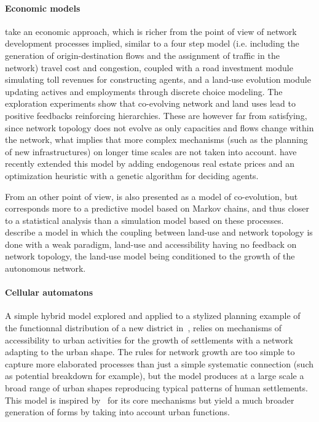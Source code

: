 \paragraph{Economic models}



\cite{levinson2007co} take an economic approach, which is richer from the point of view of network development processes implied, similar to a four step model (i.e. including the generation of origin-destination flows and the assignment of traffic in the network)  travel cost and congestion, coupled with a road investment module simulating toll revenues for constructing agents, and a land-use evolution module updating actives and employments through discrete choice modeling. The exploration experiments show that co-evolving network and land uses lead to positive feedbacks reinforcing hierarchies. These are however far from satisfying, since network topology does not evolve as only capacities and flows change within the network, what implies that more complex mechanisms (such as the planning of new infrastructures) on longer time scales are not taken into account. \cite{li2016integrated} have recently extended this model by adding endogenous real estate prices and an optimization heuristic with a genetic algorithm for deciding agents.


From an other point of view, \citep{levinson2005paving} is also presented as a model of co-evolution, but corresponds more to a predictive model based on Markov chains, and thus closer to a statistical analysis than a simulation model based on these processes. \cite{rui2011urban} describe a model in which the coupling between land-use and network topology is done with a weak paradigm, land-use and accessibility having no feedback on network topology, the land-use model being conditioned to the growth of the autonomous network.




\paragraph{Cellular automatons}


A simple hybrid model explored and applied to a stylized planning example of the functionnal distribution of a new district in~\citep{raimbault2014hybrid}, relies on mechanisms of accessibility to urban activities for the growth of settlements with a network adapting to the urban shape. The rules for network growth are too simple to capture more elaborated processes than just a simple systematic connection (such as potential breakdown for example), but the model produces at a large scale a broad range of urban shapes reproducing typical patterns of human settlements. This model is inspired by~\citep{moreno2012automate} for its core mechanisms but yield a much broader generation of forms by taking into account urban functions.


